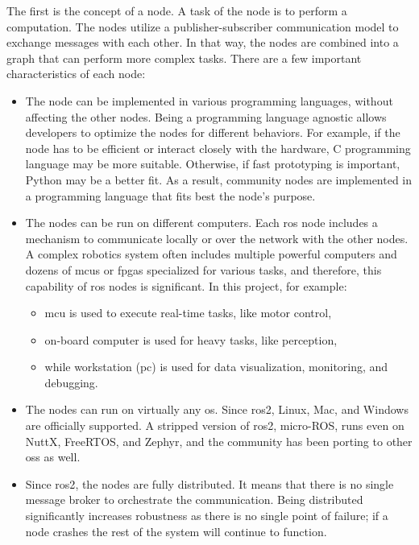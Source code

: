 The first is the concept of a node.
A task of the node is to perform a computation.
The nodes utilize a publisher-subscriber communication model to exchange messages with each other. 
In that way, the nodes are combined into a graph that can perform more complex tasks.
There are a few important characteristics of each node:
\begin{itemize}
    \item The node can be implemented in various programming languages, without affecting the other nodes.
    Being a programming language agnostic allows developers to optimize the nodes for different behaviors.
    For example, if the node has to be efficient or interact closely with the hardware, C programming language may be more suitable.
    Otherwise, if fast prototyping is important,  Python may be a better fit.
    As a result, community nodes are implemented in a programming language that fits best the node's purpose.
    \item The nodes can be run on different computers.
    Each \ac{ros} node includes a mechanism to communicate locally or over the network with the other nodes.
    A complex robotics system often includes multiple powerful computers and dozens of \acp{mcu} or \acp{fpga} specialized for various tasks, and therefore, this capability of \ac{ros} nodes is significant.
    In this project, for example:
    \begin{itemize}
        \item \ac{mcu} is used to execute real-time tasks, like motor control,
        \item on-board computer is used for heavy tasks, like perception,
        \item while workstation (\acs{pc}) is used for data visualization, monitoring, and debugging.
    \end{itemize}
    \item The nodes can run on virtually any \ac{os}.
    Since \ac{ros2}, Linux, Mac, and Windows are officially supported.
    A stripped version of \ac{ros2}, micro-ROS, runs even on NuttX, FreeRTOS, and Zephyr, and the community has been porting to other \acp{os} as well.
    \item Since \ac{ros2}, the nodes are fully distributed. 
    It means that there is no single message broker to orchestrate the communication.
    Being distributed significantly increases robustness as there is no single point of failure; if a node crashes the rest of the system will continue to function.
\end{itemize}

